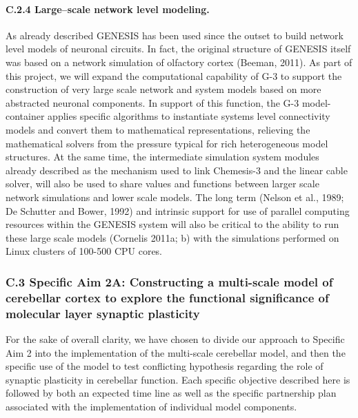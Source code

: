 \documentclass[12pt]{article}
\begin{document}
\paragraph{C.2.4 Large--scale network level modeling.} As already described GENESIS has been used since the outset to build network level models of neuronal circuits. In fact, the original structure of GENESIS itself was based on a network simulation of olfactory cortex (Beeman, 2011). As part of this project, we will expand the computational capability of G-3 to support the construction of very large scale network and system models based on more abstracted neuronal components. In support of this function, the G-3 model-container applies specific algorithms to instantiate systems level connectivity models and convert them to mathematical representations, relieving the mathematical solvers from the pressure typical for rich heterogeneous model structures. At the same time, the intermediate simulation system modules already described as the mechanism used to link Chemesis-3 and the linear cable solver, will also be used to share values and functions between larger scale network simulations and lower scale models. The long term (Nelson et al., 1989; De Schutter and Bower, 1992) and intrinsic support for use of parallel computing resources within the GENESIS system will also be critical to the ability to run these large scale models (Cornelis 2011a; b) with the simulations performed on Linux clusters of 100-500 CPU cores. \\

\subsubsection*{C.3 Specific Aim 2A: Constructing a multi-scale model of cerebellar cortex to explore the functional significance of molecular layer synaptic plasticity}

\noindent For the sake of overall clarity, we have chosen to divide our approach to Specific Aim 2 into the implementation of the multi-scale cerebellar model, and then the specific use of the model to test conflicting hypothesis regarding the role of synaptic plasticity in cerebellar function. Each specific objective described here is followed by both an expected time line as well as the specific partnership plan associated with the implementation of individual model components.
\end{document}
